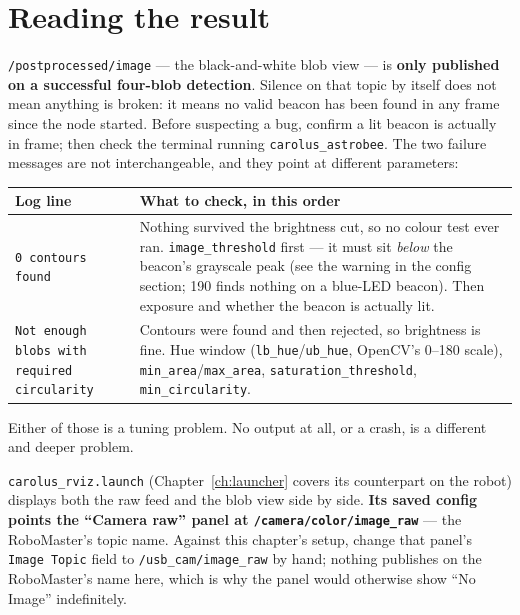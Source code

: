 \documentclass[11pt]{report}
\begin{document}
\section{Reading the result}

\texttt{/postprocessed/image} --- the black-and-white blob view --- is
\textbf{only published on a successful four-blob detection}. Silence on
that topic by itself does not mean anything is broken: it means no valid
beacon has been found in any frame since the node started. Before
suspecting a bug, confirm a lit beacon is actually in frame; then check the
terminal running \texttt{carolus\_astrobee}. The two failure messages are not
interchangeable, and they point at different parameters:

\begin{center}
\begin{tabular}{@{}p{}p{}@{}}
\toprule
\textbf{Log line} & \textbf{What to check, in this order} \\
\midrule
\texttt{0 contours found} &
Nothing survived the brightness cut, so no colour test ever ran.
\texttt{image\_threshold} first --- it must sit \emph{below} the beacon's
grayscale peak (see the warning in the config section; 190 finds nothing on
a blue-LED beacon). Then exposure and whether the beacon is actually lit. \\
\addlinespace
\texttt{Not enough blobs with required circularity} &
Contours were found and then rejected, so brightness is fine. Hue window
(\texttt{lb\_hue}/\texttt{ub\_hue}, OpenCV's 0--180 scale),
\texttt{min\_area}/\texttt{max\_area}, \texttt{saturation\_threshold},
\texttt{min\_circularity}. \\
\bottomrule
\end{tabular}
\end{center}

Either of those is a tuning problem. No output at all, or a crash, is a
different and deeper problem.

\texttt{carolus\_rviz.launch} (Chapter~\ref{ch:launcher} covers its
counterpart on the robot) displays both the raw feed and the blob view side
by side. \textbf{Its saved config points the ``Camera raw'' panel at
\texttt{/camera/color/image\_raw}} --- the RoboMaster's topic name. Against
this chapter's setup, change that panel's \texttt{Image Topic} field to
\texttt{/usb\_cam/image\_raw} by hand; nothing publishes on the RoboMaster's
name here, which is why the panel would otherwise show ``No Image''
indefinitely.
\end{document}
